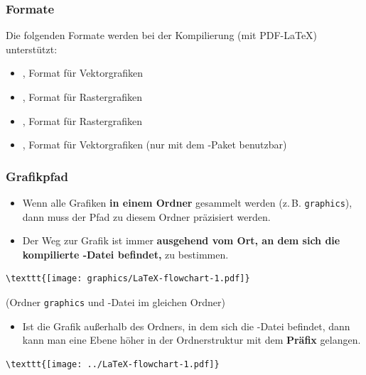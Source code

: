 \begin{frame}[fragile]
\frametitle{Formate}

Die folgenden Formate werden bei der Kompilierung (mit PDF-\LaTeX ) unterstützt:
\begin{itemize}
\item {}, Format für Vektorgrafiken
\item {}, Format für Rastergrafiken
\item {}, Format für Rastergrafiken
\item {}, Format für Vektorgrafiken (nur mit dem -Paket benutzbar)
\end{itemize}

\end{frame}


\begin{frame}[fragile]
\frametitle{Grafikpfad}

\begin{itemize}
	\item Wenn alle Grafiken \textbf{in einem Ordner} gesammelt werden (z.\,B. \texttt{graphics}), dann muss der Pfad zu diesem Ordner präzisiert werden.

	\item Der Weg zur Grafik ist immer \textbf{ausgehend vom Ort, an dem sich die kompilierte -Datei befindet,} zu bestimmen.
\end{itemize}

\begin{lstlisting}
\texttt{[image: graphics/LaTeX-flowchart-1.pdf]}  
\end{lstlisting}
(Ordner \texttt{graphics} und -Datei im gleichen Ordner)


\begin{itemize}
	\item Ist die Grafik außerhalb des Ordners, in dem sich die -Datei befindet, dann kann man eine Ebene höher in der Ordnerstruktur mit dem \textbf{Präfix}  gelangen.
\end{itemize}

\begin{lstlisting}
\texttt{[image: ../LaTeX-flowchart-1.pdf]}  
\end{lstlisting}


\end{frame}


